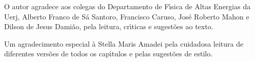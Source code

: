 O autor agradece aos colegas do Departamento de F\'{\i}sica de Altas Energias da Uerj, Alberto Franco de S\'{a} Santoro, Francisco Caruso, Jos\'{e} Roberto Mahon e Dilson de Jesus Dami\~{a}o, pela leitura, cr\'{\i}ticas  e sugest\~{o}es ao texto.

Um agradecimento especial \`{a} Stella Maris Amadei pela cuidadosa  leitura de diferentes vers\~{o}es de todos os  cap\'{\i}tulos e pelas sugest\~{o}es de estilo.


\vspace*{0.2cm}



\newpage \ \\
\thispagestyle{empty}


